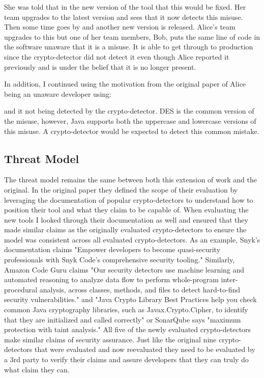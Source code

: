 
She was told that in the new version of the tool that this would be fixed. Her team upgrades to the latest version and sees that it now detects this misuse. Then some time goes by and another new version is released. Alice's team upgrades to this but one of her team members, Bob, puts the same line of code in the software unaware that it is a misuse. It is able to get through to production since the crypto-detector did not detect it even though Alice reported it previously and is under the belief that it is no longer present.

In addition, I continued using the motivation from the original paper of Alice being an unaware developer using:


and it not being detected by the crypto-detector. DES is the common version of the misuse, however, Java supports both the uppercase and lowercase versions of this misuse. A crypto-detector would be expected to detect this common mistake.

\subsection{Threat Model}
\label{ch1:subsec:ThreatModel}

The threat model remains the same between both this extension of work and the original. In the original paper they defined the scope of their evaluation by leveraging the documentation of popular crypto-detectors to understand how to position their tool and what they claim to be capable of. When evaluating the new tools I looked through their documentation as well and ensured that they made similar claims as the originally evaluated crypto-detectors to ensure the model was consistent across all evaluated crypto-detectors. As an example, Snyk's documentation claims "Empower developers to become quasi-security professionals with Snyk Code’s comprehensive security tooling." \cite{snyk} Similarly, Amazon Code Guru claims "Our security detectors use machine learning and automated reasoning to analyze data flow to perform whole-program inter-procedural analysis, across classes, methods, and files to detect hard-to-find security vulnerabilities." \cite{codeguru} and "Java Crypto Library Best Practices help you check common Java cryptography libraries, such as Javax.Crypto.Cipher, to identify that they are initialized and called correctly" or SonarQube says "maximum protection with taint analysis." \cite{sonarqube} All five of the newly evaluated crypto-detectors make similar claims of security assurance. Just like the original nine crypto-detectors that were evaluated and now reevaluated they need to be evaluated by a 3rd party to verify their claims and assure developers that they can truly do what claim they can.

